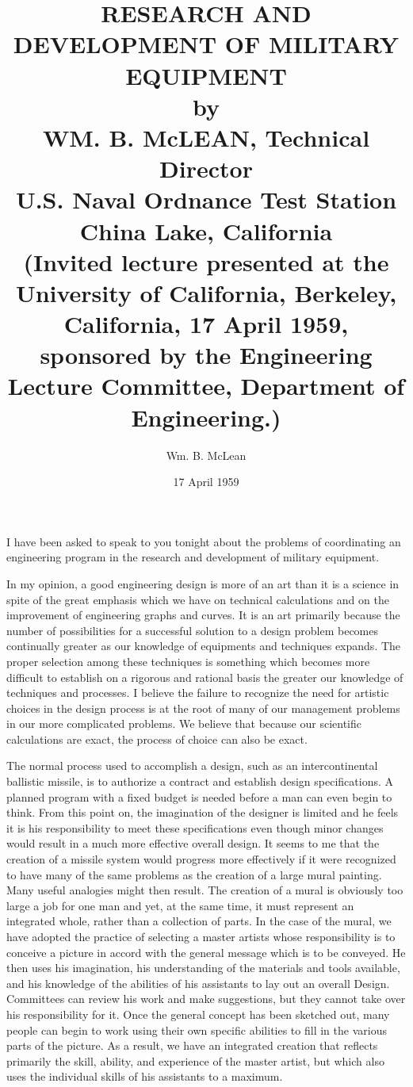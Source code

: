 \documentclass[twocolumn]{memoir}
\title{%
  RESEARCH AND DEVELOPMENT OF MILITARY EQUIPMENT \\
  \large by \\
         WM. B. McLEAN, Technical Director \\
         U.S. Naval Ordnance Test Station \\
         China Lake, California \\
  \small (Invited lecture presented at the University of California, Berkeley, California, 17 April 1959, sponsored by the Engineering Lecture Committee, Department of Engineering.)
}
\author{Wm. B. McLean}
\date{17 April 1959}
\begin{document}
\maketitle

I have been asked to speak to you tonight about the problems of coordinating an engineering program in the research and development of military equipment.

In my opinion, a good engineering design is more of an art than it is a science in spite of the great emphasis which we have on technical calculations and on the improvement of engineering graphs and curves. It is an art primarily because the number of possibilities for a successful solution to a design problem becomes continually greater as our knowledge of equipments and techniques expands. The proper selection among these techniques is something which becomes more difficult to establish on a rigorous and rational basis the greater our knowledge of techniques and processes. I believe the failure to recognize the need for artistic choices in the design process is at the root of many of our management problems in our more complicated problems. We believe that because our scientific calculations are exact, the process of choice can also be exact.

The normal process used to accomplish a design, such as an intercontinental ballistic missile, is to authorize a contract and establish design specifications. A planned program with a fixed budget is needed before a man can even begin to think. From this point on, the imagination of the designer is limited and he feels it is his responsibility to meet these specifications even though minor changes would result in a much more effective overall design. It seems to me that the creation of a missile system would progress more effectively if it were recognized to have many of the same problems as the creation of a large mural painting. Many useful analogies might then result. The creation of a mural is obviously too large a job for one man and yet, at the same time, it must represent an integrated whole, rather than a collection of parts. In the case of the mural, we have adopted the practice of selecting a master artists whose responsibility is to conceive a picture in accord with the general message which is to be conveyed. He then uses his imagination, his understanding of the materials and tools available, and his knowledge of the abilities of his assistants to lay out an overall Design. Committees can review his work and make suggestions, but they cannot take over his responsibility for it. Once the general concept has been sketched out, many people can begin to work using their own specific abilities to fill in the various parts of the picture. As a result, we have an integrated creation that reflects primarily the skill, ability, and experience of the master artist, but which also uses the individual skills of his assistants to a maximum.
\end{document}
